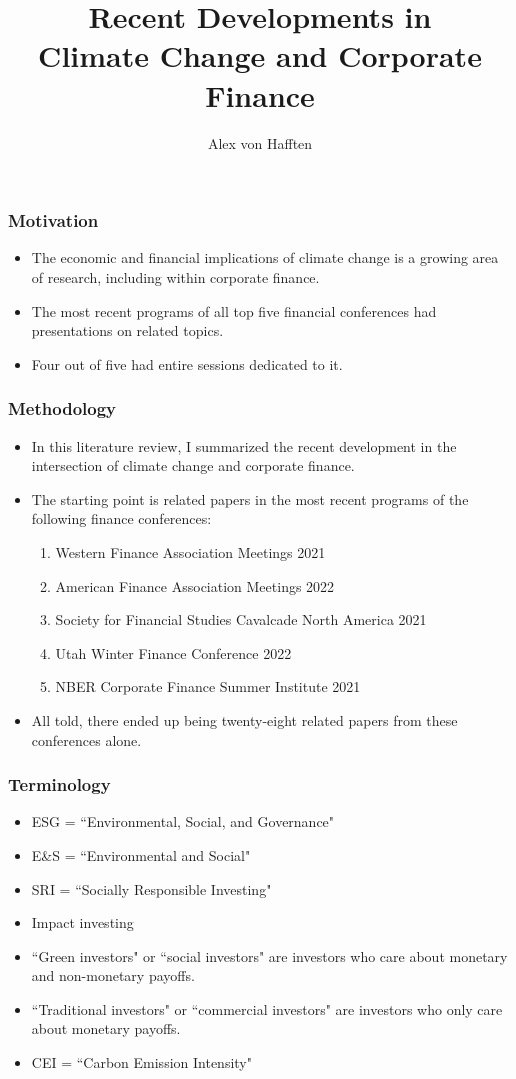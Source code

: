 \documentclass[handout]{beamer}
\title[Climate Change and Corporate Finance]{Recent Developments in \\ Climate Change and Corporate Finance}
\author{Alex von Hafften}
\institute{UW-Madison}
\begin{document}
\begin{frame}
\titlepage
\end{frame}

\begin{frame}
\frametitle{Motivation}
\begin{itemize}[<+->]
\item The economic and financial implications of climate change is a growing area of research, including within corporate finance.
\bigskip
\item The most recent programs of all top five financial conferences had presentations on related topics.
\bigskip
\item Four out of five had entire sessions dedicated to it.
\end{itemize}
\end{frame}



\begin{frame}
\frametitle{Methodology}
\begin{itemize}[<+->]
\item In this literature review, I summarized the recent development in the intersection of climate change and corporate finance.
\bigskip
\item The starting point is related papers in the most recent programs of the following finance conferences:
\begin{enumerate}
\item Western Finance Association Meetings 2021
\item American Finance Association Meetings 2022
\item Society for Financial Studies Cavalcade North America 2021
\item Utah Winter Finance Conference 2022
\item NBER Corporate Finance Summer Institute 2021
\end{enumerate}
\bigskip
\item All told, there ended up being twenty-eight related papers from these conferences alone.
\end{itemize}
\end{frame}


\begin{frame}
\frametitle{Terminology}
\begin{itemize}[<+->]
\item ESG = ``Environmental, Social, and Governance"
\item E\&S = ``Environmental and Social"
\item SRI = ``Socially Responsible Investing"
\item Impact investing

\bigskip
\item ``Green investors" or ``social investors" are investors who care about monetary and non-monetary payoffs.
\item ``Traditional investors" or ``commercial investors" are investors who only care about monetary payoffs.

\bigskip
\item CEI = ``Carbon Emission Intensity"
\end{itemize}
\end{frame}
\end{document}
